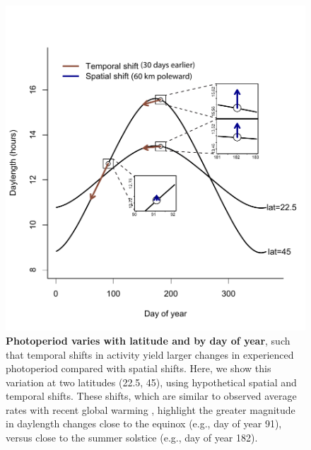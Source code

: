 \documentclass{article}
\begin{document}
\begin{figure}[p]
\centering
\includegraphics{..//..//analyses/photoperiod/figures/photo_spacetime_v2.pdf} %
\caption{\textbf{Photoperiod varies with latitude and by day of year}, such that temporal shifts in activity yield larger changes in experienced photoperiod compared with spatial shifts. Here, we show this variation at two latitudes (22.5\degree, 45\degree), using hypothetical spatial and temporal shifts. These shifts, which are similar to observed average rates with recent global warming \citep[e.g.,][]{parmesan2006,chen2011}, highlight the greater magnitude in daylength changes close to the equinox (e.g., day of year 91), versus close to the summer solstice (e.g., day of year 182).}
 \label{fig:spacetime}%
 \end{figure}
 
\end{document}

